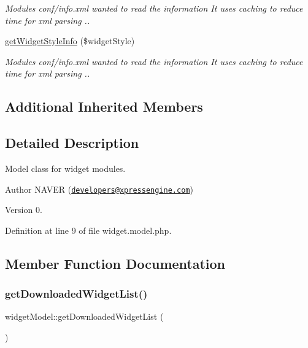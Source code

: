 \begin{DoxyCompactItemize}
\begin{DoxyCompactList}\small\item\em Modules conf/info.\+xml wanted to read the information It uses caching to reduce time for xml parsing .. \end{DoxyCompactList}\item 
\hyperlink{classwidgetModel_a185fc0ca0bcf22fd6efb045ce8912e47}{get\+Widget\+Style\+Info} (\$widget\+Style)
\begin{DoxyCompactList}\small\item\em Modules conf/info.\+xml wanted to read the information It uses caching to reduce time for xml parsing .. \end{DoxyCompactList}\end{DoxyCompactItemize}
\subsection*{Additional Inherited Members}


\subsection{Detailed Description}
Model class for widget modules. 

\begin{DoxyAuthor}{Author}
N\+A\+V\+ER (\href{mailto:developers@xpressengine.com}{\tt developers@xpressengine.\+com}) 
\end{DoxyAuthor}
\begin{DoxyVersion}{Version}
0. 
\end{DoxyVersion}


Definition at line 9 of file widget.\+model.\+php.



\subsection{Member Function Documentation}
\hypertarget{classwidgetModel_a0035e5c87cd625a1f84d9b0a0f146e02}{}\label{classwidgetModel_a0035e5c87cd625a1f84d9b0a0f146e02} 
\subsubsection{\texorpdfstring{get\+Downloaded\+Widget\+List()}{getDownloadedWidgetList()}}
{\footnotesize\ttfamily widget\+Model\+::get\+Downloaded\+Widget\+List (\begin{DoxyParamCaption}{ }\end{DoxyParamCaption})}



